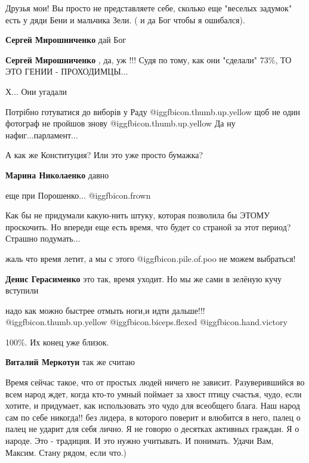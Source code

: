 \begin{itemize}

Друзья мои! Вы просто не представляете себе, сколько еще "веселых задумок" есть
у дяди Бени и мальчика Зели. ( и да Бог чтобы я ошибался).

\begin{itemize} %
\textbf{Сергей Мирошниченко} дай Бог

\textbf{Сергей Мирошниченко} , да, уж !!! Судя по тому, как они "сделали" 73\%, ТО ЭТО ГЕНИИ - ПРОХОДИМЦЫ...
\end{itemize} %

Х... Они угадали

Потрібно готуватися до виборів у Раду @igg{fbicon.thumb.up.yellow}  щоб не один фотограф не пройшов знову @igg{fbicon.thumb.up.yellow} 
Да ну нафиг...парламент...

А как же Конституция? Или это уже просто бумажка?

\begin{itemize} %
\textbf{Марина Николаенко} давно

еще при Порошенко...  @igg{fbicon.frown} 
\end{itemize} %


Как бы не придумали какую-нить штуку, которая позволила бы ЭТОМУ проскочить. Но
впереди еще есть время, что будет со страной за этот период? Страшно
подумать...


жаль что время летит, а мы с этого  @igg{fbicon.pile.of.poo}  не можем выбраться!

\begin{itemize} %
\textbf{Денис Герасименко} это так, время уходит. Но мы же сами в зелёную кучу вступили

надо как можно быстрее отмыть ноги,и идти дальше!!! @igg{fbicon.thumb.up.yellow}  @igg{fbicon.biceps.flexed} @igg{fbicon.hand.victory}
\end{itemize} %

100\%. Их конец уже близок.

\textbf{Виталий Меркотун} так же считаю


Время сейчас такое, что от простых людей ничего не зависит. Разуверившийся во
всем народ ждет, когда кто-то умный поймает за хвост птицу счастья, чудо, если
хотите, и придумает, как использовать это чудо для всеобщего блага. Наш народ
сам по себе никогда!! без лидера, в которого поверит и влюбится в него, палец о
палец не ударит для себя лично. Я не говорю о десятках активных граждан. Я о
народе. Это - традиция. И это нужно учитывать. И понимать. Удачи Вам, Максим.
Стану рядом, если что.)


\end{itemize}
